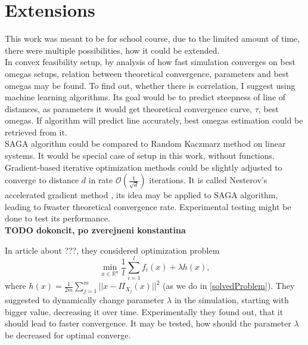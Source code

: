 \documentclass[11pt]{book}
\newcommand{\R}{\mathbb{R}}
\begin{document}
\section{Extensions}
This work was meant to be for school course, due to the limited amount of time, there were multiple possibilities, how it could be extended.\\


In convex feasibility setup, by analysis of how fast simulation converges on best omegas setups, relation between theoretical convergence, parameters and best omegas may be found. To find out, whether there is correlation, I suggest using machine learning algorithms. Its goal would be to predict steepness of line of distances, as parameters it would get theoretical convergence curve, $\tau$, best omegas. If algorithm will predict line accurately, best omegas estimation could be retrieved from it.\\


SAGA algorithm could be compared to Random Kaczmarz method on linear systems. It would be special case of setup in this work, without functions.\\

Gradient-based iterative optimization methods could be slightly adjusted to converge to distance $d$ in rate $\mathcal{O}(\frac{1}{\sqrt{d}})$ iterations. It is called Nesterov's accelerated gradient method \cite{acceleration}, its idea may be applied to SAGA algorithm, leading to fwaster theoretical convergence rate. Experimental testing might be done to test its performance.\\

\textbf{TODO dokoncit, po zverejneni konstantina}

In article \cite{kosto} about ???, they considered optimization problem $$ \min_{x \in \R^n} \frac{1}{l}\sum_{i=1}^l f_i(x) + \lambda h(x),$$ where $h(x)=\frac{1}{2m}\sum_{j=1}^m ||x-\Pi_{X_j}(x)||^2$ (as we do in \ref{solvedProblem}). They suggested to dynamically change parameter $\lambda$ in the simulation, starting with bigger value, decreasing it over time. Experimentally they found out, that it should lead to faster convergence. It may be tested, how should the parameter $\lambda$ be decreased for optimal converge.





\end{document}
